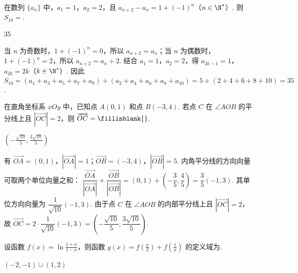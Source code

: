 \begin{problem}
在数列 \(\{a_{n}\}\) 中，\(a_{1} = 1\)，\(a_{2} = 2\)，且 \(a_{n+2} - a_{n} = 1 + (-1)^{n}\)（\(n \in \N^*\)）. 则 \(S_{10} = \)\fillinblank{}.
\end{problem}

\begin{answer}
35
\end{answer}

\begin{solution}
当 \(n\) 为奇数时，\(1+(-1)^n=0\)，所以 \(a_{n+2}=a_n\)；当 \(n\) 为偶数时，\(1+(-1)^n=2\)，所以 \(a_{n+2}=a_n+2\). 结合 \(a_1=1\)，\(a_2=2\)，得
\(a_{2k-1}=1\)，\(a_{2k}=2k\)（\(k\in\N^*\)）. 因此 \(S_{10}=(a_1+a_3+a_5+a_7+a_9)+(a_2+a_4+a_6+a_8+a_{10})=5+(2+4+6+8+10)=35\).
\end{solution}

\begin{problem}
在直角坐标系 \(xOy\) 中，已知点 \(A(0,1)\) 和点 \(B(-3,4)\). 若点 \(C\) 在 \(\angle AOB\) 的平分线上且 \(\left|\overrightarrow{OC}\right| = 2\)，则 \(\overrightarrow{OC} =\fillinblank{}\).
\end{problem}

\begin{answer}
\(\left(-\frac{\sqrt{10}}{5},\frac{3\sqrt{10}}{5}\right)\)
\end{answer}

\begin{solution}
有
\(\overrightarrow{OA}=(0,1)\)，\(\left|\overrightarrow{OA}\right|=1\)；\(\overrightarrow{OB}=(-3,4)\)，\(\left|\overrightarrow{OB}\right|=5\).
内角平分线的方向向量可取两个单位向量之和：
\(\dfrac{\overrightarrow{OA}}{\left|\overrightarrow{OA}\right|}+\dfrac{\overrightarrow{OB}}{\left|\overrightarrow{OB}\right|}=(0,1)+\left(-\dfrac35,\dfrac45\right)=\dfrac35(-1,3)\). 其单位方向向量为 \(\dfrac{1}{\sqrt{10}}(-1,3)\). 由于点 \(C\) 在 \(\angle AOB\) 的内部平分线上且 \(\left|\overrightarrow{OC}\right|=2\)，故 \(\overrightarrow{OC}=2\cdot\dfrac{1}{\sqrt{10}}(-1,3)=\left(-\dfrac{\sqrt{10}}5,\dfrac{3\sqrt{10}}5\right)\).
\end{solution}

\begin{problem}
设函数 \( f(x) = \ln \frac{1 + x}{1 - x} \)，则函数 \( g(x) = f\left(\frac{x}{2}\right) + f\left(\frac{1}{x}\right) \) 的定义域为\fillinblank{}.
\end{problem}

\begin{answer}
\((-2,-1)\cup(1,2)\)
\end{answer}

